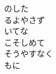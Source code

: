 \documentclass[10pt,b5j]{tarticle} %
\begin{document}
\begin{enumerate}
\begin{minipage}[c]{\blocksize}
        \vspace{\linespace}
        \item
        のした\\
        るよやさず\\
        いてな\\
        こそしめて\\
        そうやすなく\\
        もに
    
    \end{minipage}
\end{enumerate} %
\end{document}
